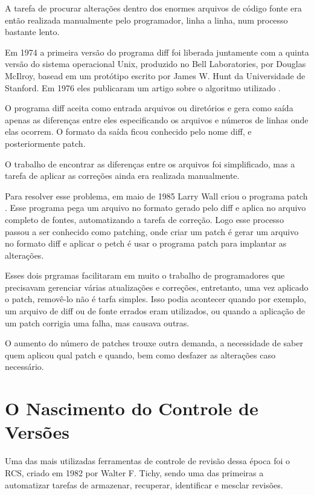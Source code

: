 A tarefa de procurar alterações dentro dos enormes arquivos de código fonte
era então realizada manualmente pelo programador, linha a linha, num processo
bastante lento.

Em 1974 a primeira versão do programa diff foi liberada juntamente com a quinta
versão do sistema operacional Unix, produzido no Bell Laboratories, por Douglas
McIlroy, basead em um protótipo escrito por James W. Hunt da Universidade de
Stanford. Em 1976 eles publicaram um artigo sobre o algoritmo utilizado \cite{Hunt}.

O programa diff aceita como entrada arquivos ou diretórios e gera como saída
apenas as diferenças entre eles especificando os arquivos e números de linhas
onde elas ocorrem. O formato da saída ficou conhecido pelo nome diff, e
posteriormente patch.

O trabalho de encontrar as diferenças entre os arquivos foi simplificado, mas
a tarefa de aplicar as correções ainda era realizada manualmente.

Para resolver esse problema, em maio de 1985 Larry Wall criou o programa patch \cite{Wall}.
Esse programa pega um arquivo no formato gerado pelo diff e aplica no arquivo
completo de fontes, automatizando a tarefa de correção. Logo esse processo
passou a ser conhecido como patching, onde criar um patch é gerar um arquivo
no formato diff e aplicar o petch é usar o programa patch para implantar as
alterações.

Esses dois prgramas facilitaram em muito o trabalho de programadores que
precisavam gerenciar várias atualizações e correções, entretanto, uma vez
aplicado o patch, removê-lo não é tarfa simples. Isso podia acontecer quando
por exemplo, um arquivo de diff ou de fonte errados eram utilizados, ou
quando a aplicação de um patch corrigia uma falha, mas causava outras.

O aumento do número de patches trouxe outra demanda, a necessidade de
saber quem aplicou qual patch e quando, bem como desfazer as alterações
caso necessário.


\section{O Nascimento do Controle de Versões}

Uma das mais utilizadas ferramentas de controle de revisão dessa época
foi o RCS, criado em 1982 por Walter F. Tichy, sendo uma das primeiras
a automatizar tarefas de armazenar, recuperar, identificar e mesclar
revisões.

